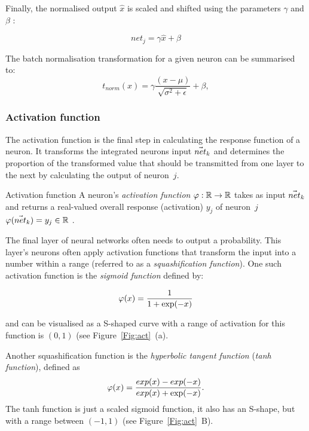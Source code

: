 Finally, the normalised output $\hat{x}$ is scaled and shifted using the parameters  $\gamma$  and  $\beta$ :

\begin{equation}
net_j = \gamma \hat{x} + \beta
\end{equation}


The batch normalisation transformation for a given neuron can be summarised to:
\begin{equation}
    t_{norm}(x) = \gamma \frac{(x-\mu)}{\sqrt{\sigma^2 +\epsilon}} + \beta ,
\end{equation}

\subsubsection{Activation function}
\label{section:act}
The activation function is the final step in calculating the response function of a neuron. It transforms the integrated neurons input $\vec{net}_{k}$ and determines the proportion of the transformed value that should be transmitted from one layer to the next by calculating the output of neuron~$j$. 
\begin{Definition}{Activation function}{}
A neuron's \emph{activation function} $\varphi:\mathbb{R} \to \mathbb{R}$ takes as input $\vec{net}_{k}$ and returns a real-valued overall response (activation) $y_j$ of neuron~$j$ $\varphi(\vec{net}_{k})=y_j\in \mathbb{R}$ .
\end{Definition}

The final layer of neural networks often needs to output a probability. This layer's neurons often apply activation functions that transform the input into a number within a range (referred to as a \textit{squashification function}). One such activation function is the \textit{sigmoid function} defined by:

\begin{equation}
\label{eq:sigmoid}
\varphi(x)=\frac{1}{1+\exp (-x)}
\end{equation}

and can be visualised as a S-shaped curve with a range of activation for this function is $(0,1)$ (see Figure~\ref{Fig:act}~(a).

Another squashification function is the \textit{hyperbolic tangent function} (\textit{tanh function}), defined as
\begin{equation*}
\varphi(x)=\frac{exp(x) - exp (-x)}{exp (x)+\exp (-x)}.
\end{equation*}
The tanh function is just a scaled sigmoid function, it also has an S-shape, but with a range between $(-1, 1)$ (see Figure~\ref{Fig:act}~B). 

